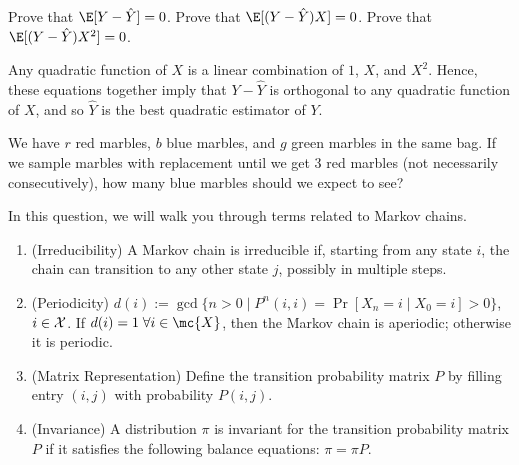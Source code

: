 \begin{Parts}
  \Part Prove that $\E[Y - \hat{Y}] = 0$.
  \Part Prove that $\E[(Y - \hat{Y})X] = 0$.
  \Part Prove that $\E[(Y - \hat{Y})X^2] = 0$.
\end{Parts}
Any quadratic function of $X$ is a linear combination of $1$, $X$, and $X^2$. Hence, these equations together imply that $Y - \hat{Y}$ is orthogonal to any quadratic function of $X$, and so $\hat{Y}$ is the best quadratic estimator of $Y$.



We have $r$ red marbles, $b$ blue marbles, and $g$ green marbles in the same bag. If we sample marbles with replacement until we get 3 red marbles (not necessarily consecutively), how many blue marbles should we expect to see?



In this question, we will walk you through terms related to Markov chains.

\begin{enumerate}
    \item (Irreducibility) A Markov chain is irreducible if, starting from any state $i$, the chain can transition to any other state $j$, possibly in multiple steps.

    \item (Periodicity) $d(i) := \gcd\{n > 0 \mid P^n(i, i) = \Pr[X_n = i \mid X_0 = i] > 0 \}$, $i \in {\cal X}$. If $d(i) = 1 \; \forall i \in \mc{X}$, then the Markov chain is aperiodic; otherwise it is periodic.

    \item (Matrix Representation) Define the transition probability matrix $P$ by filling entry $(i, j)$ with probability $P(i, j)$.

\item (Invariance) A distribution $\pi$ is invariant for the transition probability matrix $P$ if it satisfies the following balance equations: $\pi = \pi P$.

\end{enumerate}

\begin{figure}[H]
    \centering
{}
\end{figure}

